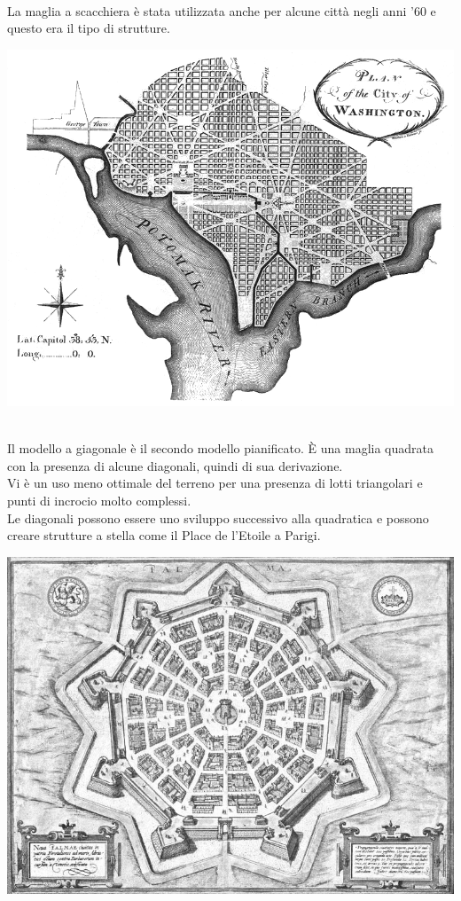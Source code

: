 \documentclass[a4paper,12pt, oneside]{book}
\begin{document}
  \leavevmode\\
  La maglia a scacchiera è stata utilizzata anche per alcune città negli anni '60 e questo era il tipo di strutture.\\
    \begin{center}
  	\includegraphics[width=0.5\linewidth]{"immagini/La-citta-triangolare-Il-piano-de-lEnfant-per-Washington-1791"}
  	\label{fig:La-citta-triangolare-Il-piano-de-lEnfant-per-Washington-1791}
  \end{center}
  \leavevmode\\
  Il modello a giagonale è il secondo modello pianificato. È una maglia quadrata con la presenza di alcune diagonali, quindi di sua derivazione.\\ Vi è un uso meno ottimale del terreno per una presenza di lotti triangolari e punti di incrocio molto complessi.\\ Le diagonali possono essere uno sviluppo successivo alla quadratica e possono creare strutture a stella come il Place de l'Etoile a Parigi.\\
   \begin{center}
  	\includegraphics[width=0.6\linewidth]{"immagini/palmanova_mappa"}
  	\label{fig:palmanova_mappa}
  \end{center}
\end{document}
